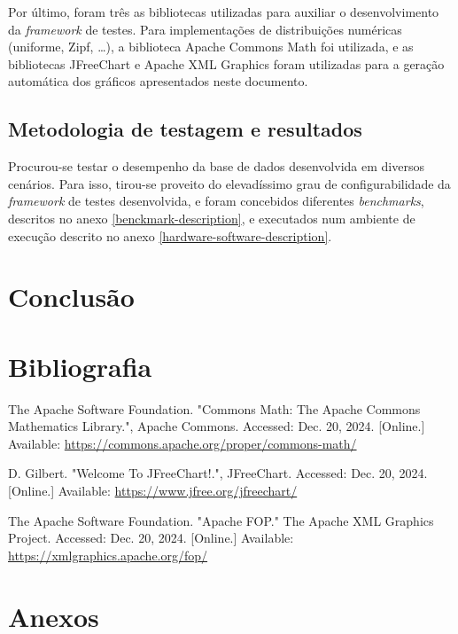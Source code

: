 \documentclass[11pt, a4paper]{article}
\begin{document}
Por último, foram três as bibliotecas utilizadas para auxiliar o desenvolvimento da \emph{framework}
de testes. Para implementações de distribuições numéricas (uniforme, Zipf, \ldots), a biblioteca
Apache Commons Math \cite{apache-commons-math} foi utilizada, e as bibliotecas JFreeChart
\cite{jfreechart} e Apache XML Graphics \cite{apache-xml-graphics} foram utilizadas para a geração
automática dos gráficos apresentados neste documento.

\subsection{Metodologia de testagem e resultados}

Procurou-se testar o desempenho da base de dados desenvolvida em diversos cenários. Para isso,
tirou-se proveito do elevadíssimo grau de configurabilidade da \emph{framework} de testes
desenvolvida, e foram concebidos diferentes \emph{benchmarks}, descritos no anexo
\ref{benckmark-description}, e executados num ambiente de execução descrito no anexo
\ref{hardware-software-description}.

\section{Conclusão}

\section{Bibliografia}
\def\refname{}
\vspace{-1.5cm}
\begin{thebibliography}{9}
        The Apache Software Foundation. "Commons Math: The Apache Commons Mathematics Library."{},
        Apache Commons. Accessed: Dec. 20, 2024. [Online.] Available:
        \url{https://commons.apache.org/proper/commons-math/}

        D. Gilbert. "Welcome To JFreeChart!."{}, JFreeChart. Accessed: Dec. 20, 2024. [Online.]
        Available: \url{https://www.jfree.org/jfreechart/}

        The Apache Software Foundation. "Apache FOP."{} The Apache XML Graphics Project. Accessed:
        Dec. 20, 2024. [Online.] Available: \url{https://xmlgraphics.apache.org/fop/}
\end{thebibliography}

\section{Anexos}
\end{document}
